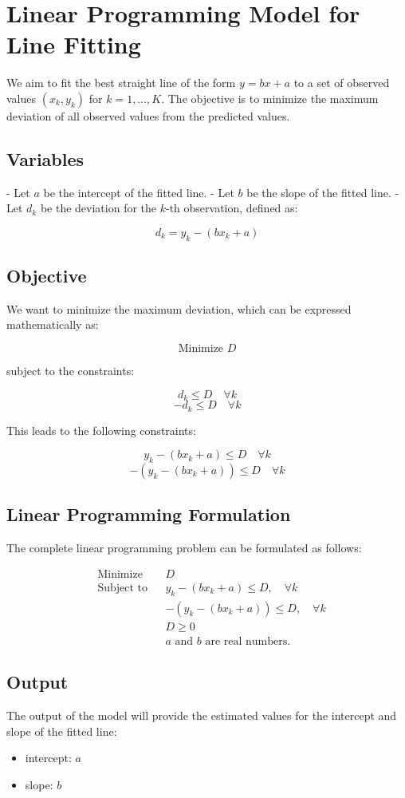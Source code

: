 \documentclass{article}
\begin{document}
\section*{Linear Programming Model for Line Fitting}

We aim to fit the best straight line of the form \( y = bx + a \) to a set of observed values \( (x_k, y_k) \) for \( k = 1, \ldots, K \). The objective is to minimize the maximum deviation of all observed values from the predicted values.

\subsection*{Variables}
- Let \( a \) be the intercept of the fitted line.
- Let \( b \) be the slope of the fitted line.
- Let \( d_k \) be the deviation for the \( k \)-th observation, defined as:

\[
d_k = y_k - (bx_k + a)
\]

\subsection*{Objective}
We want to minimize the maximum deviation, which can be expressed mathematically as:

\[
\text{Minimize } D
\]

subject to the constraints:

\[
d_k \leq D \quad \forall k
\]
\[
-d_k \leq D \quad \forall k
\]

This leads to the following constraints:

\[
y_k - (bx_k + a) \leq D \quad \forall k
\]
\[
-(y_k - (bx_k + a)) \leq D \quad \forall k
\]

\subsection*{Linear Programming Formulation}

The complete linear programming problem can be formulated as follows:

\[
\begin{aligned}
& \text{Minimize} && D \\
& \text{Subject to} && y_k - (bx_k + a) \leq D, \quad \forall k \\
& && -(y_k - (bx_k + a)) \leq D, \quad \forall k \\
& && D \geq 0 \\
& && a \text{ and } b \text{ are real numbers.}
\end{aligned}
\]

\subsection*{Output}
The output of the model will provide the estimated values for the intercept and slope of the fitted line:

\begin{itemize}
    \item intercept: \( a \)
    \item slope: \( b \)
\end{itemize}
\end{document}
